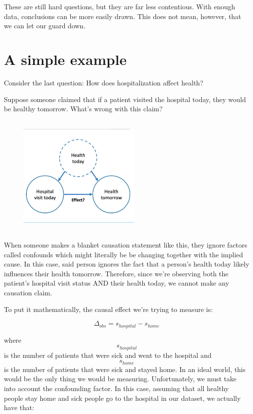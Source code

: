 These are still hard questions, but they are far less contentious. With enough data, conclusions can be more easily drawn. This does not mean, however, that we can let our guard down.

\section{A simple example}

Consider the last question: How does hospitalization affect health?

Suppose someone claimed that if a patient visited the hospital today, they would be healthy tomorrow. What's wrong with this claim?

\begin{figure}[H]
\includegraphics[width=6cm, height=6cm]{figures/health.png}
\centering
\end{figure}

When someone makes a blanket causation statement like this, they ignore factors called confounds which might literally be be changing together with the implied cause. In this case, said person ignores the fact that a person's health today likely influences their health tomorrow. Therefore, since we're observing both the patient's hospital visit status AND their health today, we cannot make any causation claim.

To put it mathematically, the causal effect we're trying to measure is:

\[\Delta_{obs} = s_{hospital} - s_{home}\]

where $$s_{hospital}$$ is the number of patients that were sick and went to the hospital and $$s_{home}$$ is the number of patients that were sick and stayed home. In an ideal world, this would be the only thing we would be measuring. Unfortunately, we must take into account the confounding factor. In this case, assuming that all healthy people stay home and sick people go to the hospital in our dataset, we actually have that:


